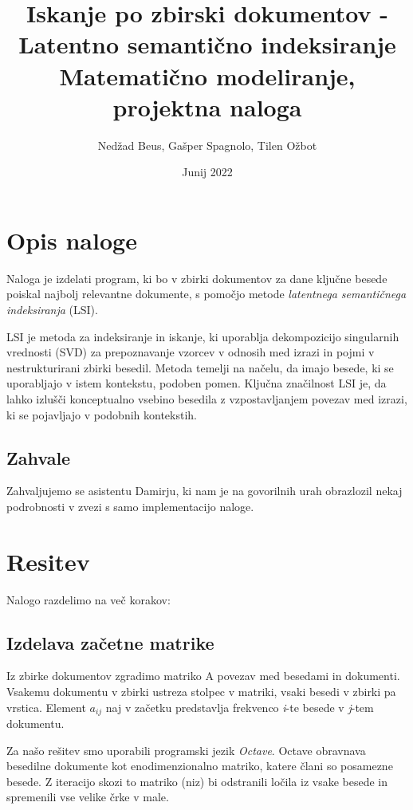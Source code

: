 \documentclass{article}
\title{Iskanje po zbirski dokumentov -
        Latentno semantično indeksiranje \\
        \large Matematično modeliranje, projektna naloga}
\author{Nedžad Beus, Gašper Spagnolo, Tilen Ožbot}
\date{Junij 2022}
\begin{document}
\maketitle
\pagebreak

\section{Opis naloge}
\par Naloga je izdelati program, ki bo v zbirki dokumentov za dane ključne besede poiskal najbolj relevantne dokumente, s pomočjo metode \textit{latentnega semantičnega indeksiranja} (LSI). 
\par LSI je metoda za indeksiranje in iskanje, ki uporablja dekompozicijo singularnih vrednosti (SVD) za prepoznavanje vzorcev v odnosih med izrazi in pojmi v nestrukturirani zbirki besedil. Metoda temelji na načelu, da imajo besede, ki se uporabljajo v istem kontekstu, podoben pomen. Ključna značilnost LSI je, da lahko izlušči konceptualno vsebino besedila z vzpostavljanjem povezav med izrazi, ki se pojavljajo v podobnih kontekstih.

\subsection{Zahvale}
Zahvaljujemo se asistentu Damirju, ki nam je na govorilnih urah obrazlozil nekaj podrobnosti v zvezi s samo implementacijo naloge.

\newpage

\section{Resitev}
Nalogo razdelimo na več korakov:

\subsection{Izdelava začetne matrike}
Iz zbirke dokumentov zgradimo matriko A povezav med besedami in dokumenti. Vsakemu dokumentu v zbirki ustreza stolpec v matriki, vsaki besedi v zbirki pa vrstica. Element $a_{ij}$ naj v začetku predstavlja frekvenco \textit{i}-te besede v \textit{j}-tem dokumentu.

Za našo rešitev smo uporabili programski jezik \textit{Octave}. Octave obravnava besedilne dokumente kot enodimenzionalno matriko, katere člani so posamezne besede. Z iteracijo skozi to matriko (niz) bi odstranili ločila iz vsake besede in spremenili vse velike črke v male. 
\end{document}
